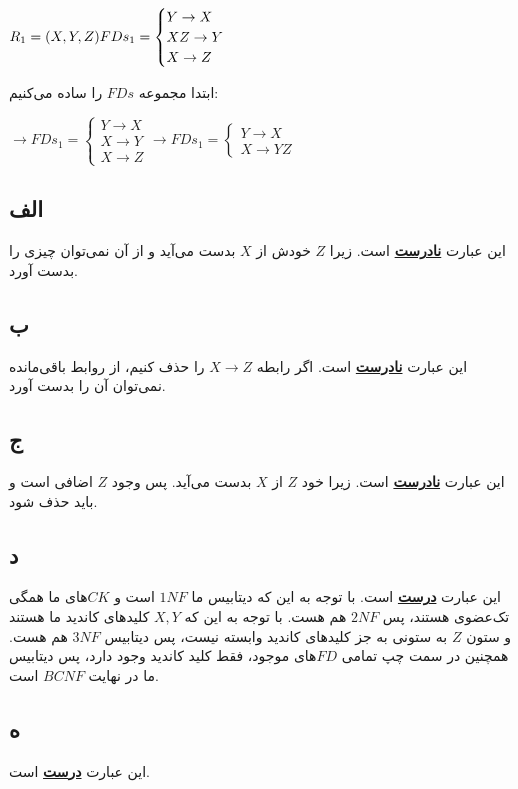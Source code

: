 \setLTR
$
R_1 = (X,Y,Z)\\ \\
FDs_1=\begin{cases}
	Y\rightarrow X \\  XZ\rightarrow Y \\ X\rightarrow Z
	\end{cases}
$
\setRTL

ابتدا مجموعه‌ $FDs$ را ساده می‌کنیم:

\setLTR
$
 \longrightarrow FDs_1=\begin{cases}
	Y\rightarrow X \\  X\rightarrow Y \\ X\rightarrow Z
\end{cases} \longrightarrow FDs_1=\begin{cases}
	Y\rightarrow X \\  X\rightarrow YZ 
\end{cases}
$
\setRTL

\subsection*{الف}
این عبارت 
\underline{\textbf{نادرست}}
است.
زیرا $Z$ خودش از $X$ بدست می‌آید و از آن نمی‌توان چیزی را بدست آورد.
\subsection*{ب}
این عبارت 
\underline{\textbf{نادرست}}
است.
اگر رابطه 
$X\rightarrow Z$
را حذف کنیم، از روابط باقی‌مانده نمی‌توان آن را بدست آورد.
\subsection*{ج}
این عبارت 
\underline{\textbf{نادرست}}
است.
زیرا خود $Z$ از $X$ بدست می‌آید. پس وجود $Z$ اضافی است و باید حذف شود.
\subsection*{د}
این عبارت 
\underline{\textbf{درست}}
است.
با توجه به این که دیتابیس ما $1NF$ است و $CK$های ما همگی تک‌عضوی هستند، پس $2NF$ هم هست. با توجه به این که $X,Y$ کلیدهای کاندید ما هستند و ستون $Z$ به ستونی به جز کلیدهای کاندید وابسته نیست، پس دیتابیس $3NF$ هم هست. همچنین در سمت چپ تمامی $FD$های موجود، فقط کلید کاندید وجود دارد، پس دیتابیس ما در نهایت $BCNF$ است.
\subsection*{ه}
این عبارت 
\underline{\textbf{درست}}
است.

